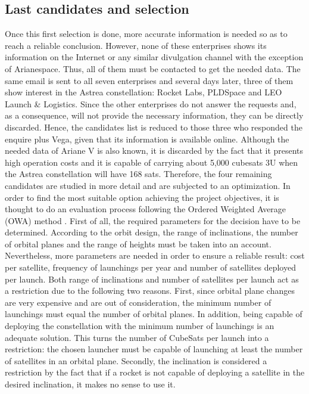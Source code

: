 	\subsection{Last candidates and selection}
Once this first selection is done, more accurate information is needed so as to reach a reliable conclusion. However, none of these enterprises shows its information on the Internet or any similar divulgation channel with the exception of Arianespace. Thus, all of them must be contacted to get the needed data. The same email is sent to all seven enterprises and several days later, three of them show interest in the Astrea constellation: Rocket Labs, PLDSpace and LEO Launch \& Logistics. Since the other enterprises do not answer the requests and, as a consequence, will not provide the necessary information, they can be directly discarded. Hence, the candidates list is reduced to those three who responded the enquire plus Vega, given that its information is available online. Although the needed data of Ariane V is also known, it is discarded by the fact that it presents high operation costs and it is capable of carrying about 5,000 cubesats 3U when the Astrea constellation will have 168 sats. Therefore, the four remaining candidates are studied in more detail and are subjected to an optimization. 
\newline
\newline
In order to find the most suitable option achieving the project objectives, it is thought to do an evaluation process following the Ordered Weighted Average (OWA) method . First of all, the required parameters for the decision have to be determined. According to the orbit design, the range of inclinations, the number of orbital planes and the range of heights must be taken into an account. Nevertheless, more parameters are needed in order to ensure a reliable result: cost per satellite, frequency of launchings per year and number of satellites deployed per launch. Both range of inclinations and number of satellites per launch act as a restriction due to the following two reasons. First, since orbital plane changes are very expensive and are out of consideration, the minimum number of launchings must equal the number of orbital planes. In addition, being capable of deploying the constellation with the minimum number of launchings is an adequate solution. This turns the number of CubeSats per launch into a restriction: the chosen launcher must be capable of launching at least the number of satellites in an orbital plane. Secondly, the inclination is considered a restriction by the fact that if a rocket is not capable of deploying a satellite in the desired inclination, it makes no sense to use it. 

